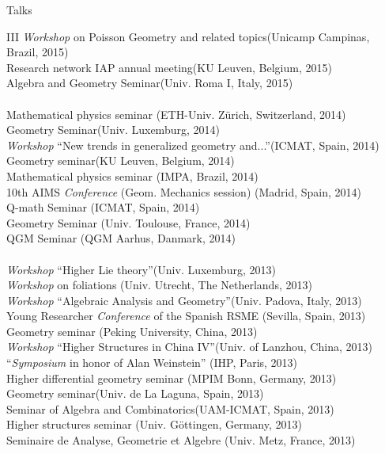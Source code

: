 \documentclass[12p]{resume}
\begin{document}
\begin{category}{Talks}
\begin{tabbing}
III \emph{Workshop} on Poisson Geometry and related topics\>(Unicamp Campinas, Brazil, 2015)\\
Research network IAP annual meeting\>(KU Leuven, Belgium, 2015)\\
Algebra and Geometry Seminar\>(Univ. Roma I, Italy, 2015)\\
\>\\
Mathematical physics seminar \>(ETH-Univ. Z\"urich, Switzerland, 2014)\\
Geometry Seminar\>(Univ. Luxemburg, 2014)\\
\emph{Workshop} ``New trends in generalized geometry and...''\>(ICMAT, Spain, 2014)\\
Geometry seminar\>(KU Leuven, Belgium, 2014)\\
Mathematical physics seminar\> (IMPA, Brazil, 2014)\\
10th AIMS \emph{Conference} (Geom. Mechanics session) \>(Madrid, Spain, 2014)\\
Q-math Seminar \>(ICMAT, Spain, 2014)\\
Geometry Seminar \>(Univ. Toulouse, France, 2014)\\
QGM Seminar \>(QGM Aarhus, Danmark, 2014)\\
\>\\
\emph{Workshop} ``Higher Lie theory''\>(Univ. Luxemburg, 2013)\\
\emph{Workshop} on foliations \>(Univ. Utrecht, The Netherlands, 2013)\\
\emph{Workshop} ``Algebraic Analysis and Geometry''\>(Univ. Padova, Italy, 2013)\\
Young Researcher \emph{Conference} of the Spanish RSME  \>(Sevilla, Spain, 2013)\\
Geometry seminar \>(Peking University, China, 2013)\\
\emph{Workshop} ``Higher Structures in China IV''\>(Univ. of Lanzhou, China, 2013)\\
 ``\emph{Symposium} in honor of Alan Weinstein''\> (IHP, Paris, 2013)\\
 Higher differential geometry seminar \>(MPIM Bonn, Germany, 2013)\\
Geometry seminar\>(Univ. de La Laguna, Spain, 2013)\\
Seminar of  Algebra and Combinatorics\>(UAM-ICMAT, Spain, 2013)\\
Higher structures  seminar \>(Univ. G\"ottingen, Germany, 2013)\\
Seminaire de Analyse, Geometrie et Algebre \>(Univ. Metz, France, 2013)\\

\end{tabbing}
\end{category}
\end{document}
